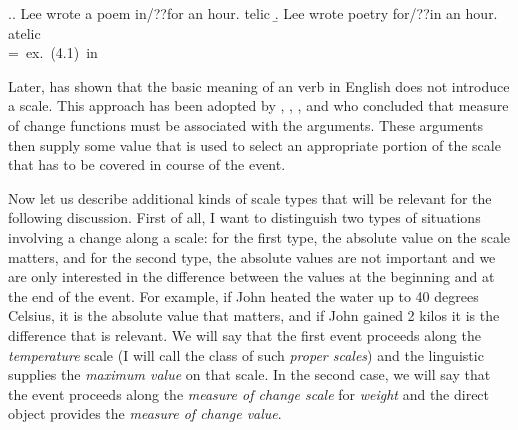 
\ex.\label{ex:Kennedy1}\a. Lee wrote a poem in/??for an hour. \hfill telic
\b. Lee wrote poetry for/??in an hour. \hfill atelic\\
\hbox{}\hfill\hbox{= ex.~(4.1) in \citealt[103]{Kennedy:12}}


%

Later, \citet{Filip:05} has shown that the basic meaning of an  verb in English does not introduce a scale. This approach has been adopted by \citet{Rappaport:08}, \citet{LevinRappaport:10}, \citet{Kennedy:12}, and \citet{Bochnak:13} who concluded that measure of change functions must be associated with the  arguments. These arguments then supply some value that is used to select an appropriate portion of the scale that has to be covered in course of the event. 

Now let us describe additional kinds of scale types that will be relevant for the following discussion. First of all, I want to distinguish two types of situations involving a change along a scale: for the first type, the absolute value on the scale matters, and for the second type, the absolute values are not important and we are only interested in the difference between the values at the beginning and at the end of the event. For example, if John heated the water up to 40 degrees Celsius, it is the absolute value that matters, and if John gained 2 kilos it is the difference that is relevant. We will say that the first event proceeds along the \textit{temperature} scale (I will call the class of such  \textit{proper scales}) and the linguistic  supplies the \textit{maximum value} on that scale. In the second case, we will say that the event proceeds along the \textit{measure of change scale} for \textit{weight} and the direct object provides the \textit{measure of change value}. 

